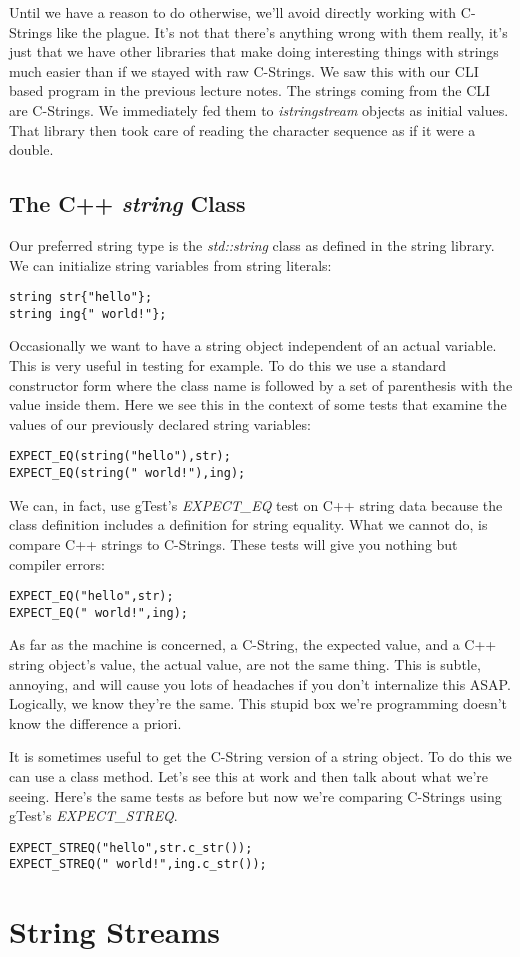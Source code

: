 \documentclass[]{tufte-handout}
\begin{document}
Until we have a reason to do otherwise, we'll avoid directly working with C-Strings like the plague. It's not that there's anything wrong with them really, it's just that we have other libraries that make doing interesting things with strings much easier than if we stayed with raw C-Strings. We saw this with our CLI based program in the previous lecture notes. The strings coming from the CLI are C-Strings. We immediately fed them to \textit{istringstream} objects as initial values. That library then took care of reading the character sequence as if it were a double. 

\subsection{The C++ \textit{string} Class}

Our preferred string type is the \textit{std::string} class as defined in the string library.  We can initialize string variables from string literals:
\begin{verbatim}
string str{"hello"};
string ing{" world!"};
\end{verbatim}
Occasionally we want to have a string object independent of an actual variable. This is very useful in testing for example. To do this we use a standard constructor form where the class name is followed by a set of parenthesis with the value inside them.  Here we see this in the context of some tests that examine the values of our previously declared string variables:
\begin{verbatim}
EXPECT_EQ(string("hello"),str);
EXPECT_EQ(string(" world!"),ing);
\end{verbatim}

We can, in fact, use gTest's \textit{EXPECT\_EQ} test on C++ string data because the class definition includes a definition for string equality. What we cannot do, is compare C++ strings to C-Strings. These tests will give you nothing but compiler errors:
\begin{verbatim}
EXPECT_EQ("hello",str);
EXPECT_EQ(" world!",ing);
\end{verbatim}
As far as the machine is concerned, a C-String, the expected value, and a C++ string object's value, the actual value, are not the same thing. This is subtle, annoying, and will cause you lots of headaches if you don't internalize this ASAP. Logically, we know they're the same. This stupid box we're programming doesn't know the difference a priori.

It is sometimes useful to get the C-String version of a string object. To do this we can use a class method. Let's see this at work and then talk about what we're seeing. Here's the same tests as before but now we're comparing C-Strings using gTest's \textit{EXPECT\_STREQ}.
\begin{verbatim}
EXPECT_STREQ("hello",str.c_str());
EXPECT_STREQ(" world!",ing.c_str());
\end{verbatim}



\section{String Streams}
\end{document}
